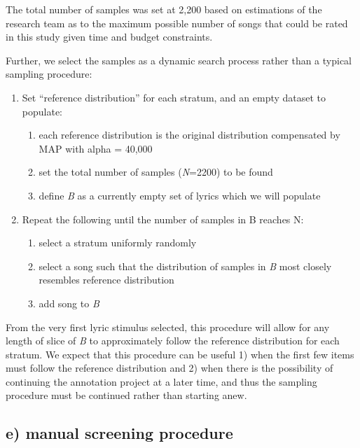 \documentclass[
  letterpaper,
  DIV=11,
  numbers=noendperiod]{scrartcl}
\providecommand{\tightlist}{%
  \setlength{\itemsep}{0pt}\setlength{\parskip}{0pt}}\usepackage{longtable,booktabs,array}
\begin{document}
The total number of samples was set at 2,200 based on estimations of the
research team as to the maximum possible number of songs that could be
rated in this study given time and budget constraints.

Further, we select the samples as a dynamic search process rather than a
typical sampling procedure:

\begin{enumerate}
\def\labelenumi{\arabic{enumi}.}
\tightlist
\item
  Set ``reference distribution'' for each stratum, and an empty dataset
  to populate:

  \begin{enumerate}
  \def\labelenumii{\alph{enumii})}
  \tightlist
  \item
    each reference distribution is the original distribution compensated
    by MAP with alpha = 40,000
  \item
    set the total number of samples (\emph{N}=2200) to be found
  \item
    define \emph{B} as a currently empty set of lyrics which we will
    populate
  \end{enumerate}
\item
  Repeat the following until the number of samples in B reaches N:

  \begin{enumerate}
  \def\labelenumii{\alph{enumii})}
  \tightlist
  \item
    select a stratum uniformly randomly
  \item
    select a song such that the distribution of samples in \emph{B} most
    closely resembles reference distribution
  \item
    add song to \emph{B}
  \end{enumerate}
\end{enumerate}

From the very first lyric stimulus selected, this procedure will allow
for any length of slice of \emph{B} to approximately follow the
reference distribution for each stratum. We expect that this procedure
can be useful 1) when the first few items must follow the reference
distribution and 2) when there is the possibility of continuing the
annotation project at a later time, and thus the sampling procedure must
be continued rather than starting anew.

\hypertarget{sec-manualscreening}{%
\subsection{e) manual screening procedure}\label{sec-manualscreening}}
\end{document}
